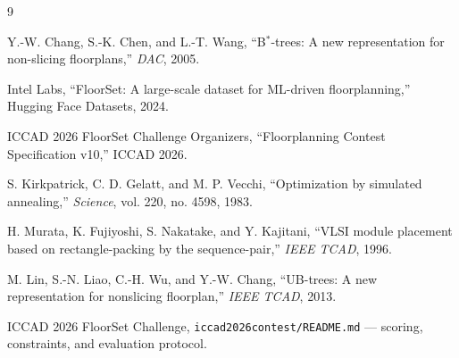 \documentclass[11pt]{article}
\begin{document}
\begin{thebibliography}{9}

Y.-W. Chang, S.-K. Chen, and L.-T. Wang,
``B$^*$-trees: A new representation for non-slicing floorplans,''
\textit{DAC}, 2005.

Intel Labs,
``FloorSet: A large-scale dataset for ML-driven floorplanning,''
Hugging Face Datasets, 2024.

ICCAD 2026 FloorSet Challenge Organizers,
``Floorplanning Contest Specification v10,''
ICCAD 2026.

S. Kirkpatrick, C. D. Gelatt, and M. P. Vecchi,
``Optimization by simulated annealing,''
\textit{Science}, vol. 220, no. 4598, 1983.

H. Murata, K. Fujiyoshi, S. Nakatake, and Y. Kajitani,
``VLSI module placement based on rectangle-packing by the sequence-pair,''
\textit{IEEE TCAD}, 1996.

M. Lin, S.-N. Liao, C.-H. Wu, and Y.-W. Chang,
``UB-trees: A new representation for nonslicing floorplan,'' 
\textit{IEEE TCAD}, 2013.

ICCAD 2026 FloorSet Challenge,
\texttt{iccad2026contest/README.md} --- scoring, constraints, and evaluation protocol.

\end{thebibliography}
\end{document}
